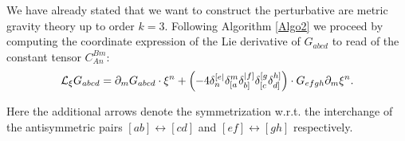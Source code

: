 \documentclass[a4paper,12pt, DIV=14, BCOR=5mm, twoside, headsepline, numbers=noenddot]{scrbook}
\newcommand{\mathnode}[1]{%
   \mathord{\tikz[baseline=(#1.base), inner sep = 0pt]{\node (#1) {$\scriptstyle{#1}$};}}}
\begin{document}
We have already stated that we want to construct the perturbative are metric gravity theory up to order $k=3$. Following Algorithm \ref{Algo2} we proceed by computing the coordinate expression of the Lie derivative of $G_{abcd}$ to read of the constant tensor $C_{An}^{Bm}$:
\begin{align}\label{LieArea}
    \mathcal{L}_{\xi} G_{abcd} = \partial_m G_{abcd} \cdot \xi^n + \left (-4 \delta_n^{[e\vert} \delta_{[\mathnode{a}}^m \delta_{b]}^{\vert \mathnode{f} ]} \delta_{[c}^{[g} \delta_{\mathnode{d}]}^{\mathnode{h}]} \right ) \cdot G_{efgh} \partial_m \xi^n.
\end{align}
Here the additional arrows denote the symmetrization w.r.t. the interchange of the antisymmetric pairs $[ab] \leftrightarrow [cd]$ and $[ef] \leftrightarrow [gh]$ respectively.
\end{document}
